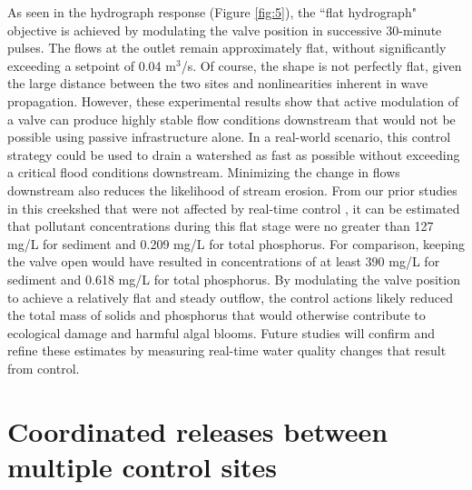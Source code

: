 As seen in the hydrograph response (Figure \ref{fig:5}), the ``flat hydrograph" objective is achieved by modulating the valve position in successive 30-minute pulses. The flows at the outlet remain approximately flat, without significantly exceeding a setpoint of 0.04 m$^3$/s. Of course, the shape is not perfectly flat, given the large distance between the two sites and nonlinearities inherent in wave propagation. However, these experimental results show that active modulation of a valve can produce highly stable flow conditions downstream that would not be possible using passive infrastructure alone. In a real-world scenario, this control strategy could be used to drain a watershed as fast as possible without exceeding a critical flood conditions downstream. Minimizing the change in flows downstream also reduces the likelihood of stream erosion. From our prior studies in this creekshed that were not affected by real-time control \cite{Wong_2016}, it can be estimated that pollutant concentrations during this flat stage were no greater than 127 mg/L for sediment and 0.209 mg/L for total phosphorus. For comparison, keeping the valve open would have resulted in concentrations of at least 390 mg/L for sediment and 0.618 mg/L for total phosphorus. By modulating the valve position to achieve a relatively flat and steady outflow, the control actions likely reduced the total mass of solids and phosphorus
that would otherwise contribute to ecological damage and harmful algal blooms. Future studies will confirm and refine these estimates by measuring real-time water quality changes that result from control.


\section{Coordinated releases between multiple control sites}

